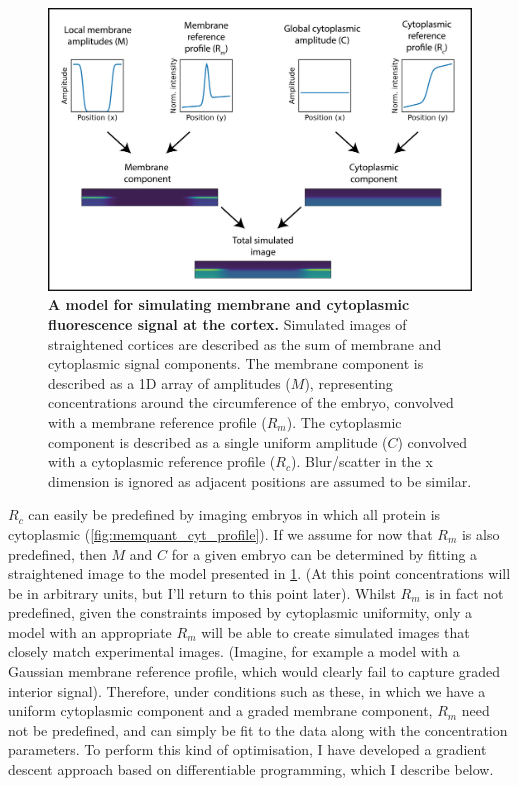 \documentclass[12pt]{"article"}
\newcommand{\mycaption}[2]{\caption[#1]{\textbf{#1.} #2}}
\begin{document}
\begin{figure}
\includegraphics[scale=1.15]{memquant_model_schematic}
\centering
\mycaption{A model for simulating membrane and cytoplasmic fluorescence signal at the cortex}{
Simulated images of straightened cortices are described as the sum of membrane and cytoplasmic signal components. The membrane component is described as a 1D array of amplitudes ($M$), representing concentrations around the circumference of the embryo, convolved with a membrane reference profile ($R_m$). The cytoplasmic component is described as a single uniform amplitude ($C$) convolved with a cytoplasmic reference profile ($R_c$). Blur/scatter in the x dimension is ignored as adjacent positions are assumed to be similar.
}
\label{fig:memquant_model_schematic}
\end{figure}

$R_c$ can easily be predefined by imaging embryos in which all protein is cytoplasmic (\cref{fig:memquant_cyt_profile}). If we assume for now that $R_m$ is also predefined, then $M$ and $C$ for a given embryo can be determined by fitting a straightened image to the model presented in \cref{fig:memquant_model_schematic}. (At this point concentrations will be in arbitrary units, but I'll return to this point later). Whilst $R_m$ is in fact not predefined, given the constraints imposed by cytoplasmic uniformity, only a model with an appropriate $R_m$ will be able to create simulated images that closely match experimental images. (Imagine, for example a model with a Gaussian membrane reference profile, which would clearly fail to capture graded interior signal). Therefore, under conditions such as these, in which we have a uniform cytoplasmic component and a graded membrane component, $R_m$ need not be predefined, and can simply be fit to the data along with the concentration parameters. To perform this kind of optimisation, I have developed a gradient descent approach based on differentiable programming, which I describe below.\\
\end{document}
